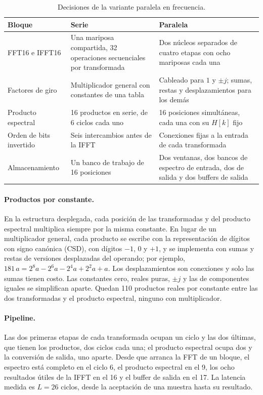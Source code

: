 \begin{table}[h]
  \centering
  \caption{Decisiones de la variante paralela en frecuencia.}\label{tab:frec-paralela}
  \small
  \begin{tabular}{lp{5.2cm}p{5.2cm}}
    \toprule
    Bloque & Serie & Paralela \\
    \midrule
    FFT16 e IFFT16 & Una mariposa compartida, 32 operaciones secuenciales por transformada & Dos núcleos separados de cuatro etapas con ocho mariposas cada una \\
    Factores de giro & Multiplicador general con constantes de una tabla & Cableado para $1$ y $\pm j$; sumas, restas y desplazamientos para los demás \\
    Producto espectral & 16 productos en serie, de 6 ciclos cada uno & 16 posiciones simultáneas, cada una con su $H[k]$ fijo \\
    Orden de bits invertido & Seis intercambios antes de la IFFT & Conexiones fijas a la entrada de cada transformada \\
    Almacenamiento & Un banco de trabajo de 16 posiciones & Dos ventanas, dos bancos de espectro de entrada, dos de salida y dos buffers de salida \\
    \bottomrule
  \end{tabular}
\end{table}

\paragraph{Productos por constante.} En la estructura desplegada, cada posición de las transformadas y del producto espectral multiplica siempre por la misma constante. En lugar de un multiplicador general, cada producto se escribe con la representación de dígitos con signo canónica (CSD), con dígitos $-1$, 0 y $+1$, y se implementa con sumas y restas de versiones desplazadas del operando; por ejemplo, $181\,a = 2^8 a - 2^6 a - 2^4 a + 2^2 a + a$. Los desplazamientos son conexiones y solo las sumas tienen costo. Las constantes cero, reales puras, $\pm j$ y las de componentes iguales se simplifican aparte. Quedan 110 productos reales por constante entre las dos transformadas y el producto espectral, ninguno con multiplicador.

\paragraph{Pipeline.} Las dos primeras etapas de cada transformada ocupan un ciclo y las dos últimas, que tienen los productos, dos ciclos cada una; el producto espectral ocupa dos y la conversión de salida, uno aparte. Desde que arranca la FFT de un bloque, el espectro está completo en el ciclo 6, el producto espectral en el 9, los ocho resultados útiles de la IFFT en el 16 y el buffer de salida en el 17. La latencia medida es $L = 26$ ciclos, desde la aceptación de una muestra hasta su resultado.

